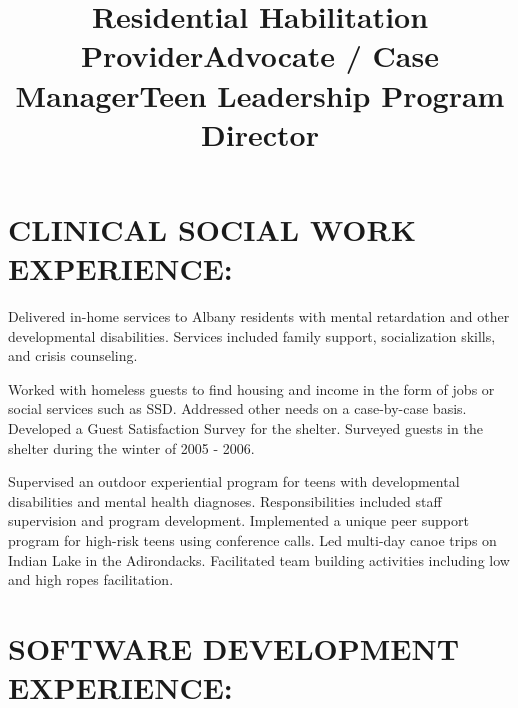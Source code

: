 \documentclass[line, mm, 10pt]{res}
\begin{document}
\begin{resume}
  \section{CLINICAL SOCIAL WORK EXPERIENCE:}

  \title{Residential Habilitation Provider}
  \begin{position}
    Delivered in-home services to Albany residents with mental
    retardation and other developmental disabilities. Services included
    family support, socialization skills, and crisis counseling.
  \end{position}

  \title{Advocate / Case Manager}
  \begin{position}
    Worked with homeless guests to find housing and income in the form
    of jobs or social services such as SSD. Addressed other needs on a case-by-case
    basis. Developed a Guest Satisfaction Survey for the shelter. Surveyed
    guests in the shelter during the winter of 2005 - 2006.
  \end{position}

  \title{Teen Leadership Program Director}
  \begin{position}
    Supervised an outdoor experiential program for teens with
    developmental disabilities and mental health
    diagnoses. Responsibilities included staff supervision and program
    development. Implemented a unique peer support program for
    high-risk teens using conference calls. Led multi-day canoe trips
    on Indian Lake in the Adirondacks. Facilitated team building
    activities including low and high ropes facilitation.
  \end{position}

  \section{SOFTWARE DEVELOPMENT EXPERIENCE:}


\end{resume}
\end{document}
